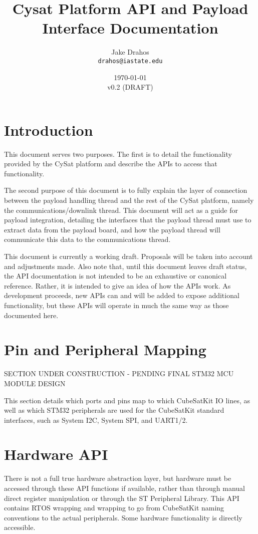 \documentclass{article}
\begin{document}
\title{Cysat Platform API and Payload Interface Documentation}
\author{Jake Drahos \\ \texttt{drahos@iastate.edu}}
\date{\today\\v0.2 (DRAFT)}

\maketitle

\tableofcontents

\section{Introduction}
This document serves two purposes. The first is to detail the functionality 
provided by the CySat platform and
describe the APIs to access that functionality.

The second purpose of this document is to fully explain the layer of connection
between the payload handling thread and the rest of the CySat platform, namely
the communications/downlink thread. This document will act as a guide for
payload integration, detailing the interfaces that the payload thread must
 use
to extract data from the payload board, and how the payload thread will 
communicate this data to the communications thread.

This document is currently a working draft. Proposals will be taken into account
and adjustments made. Also note that, until this document leaves draft status,
the API documentation is not intended to be an exhaustive or canonical
reference. Rather, it is intended to give an idea of how the APIs work. As
development proceeds, new APIs can and will be added to expose additional
functionality, but these APIs will operate in much the same way as those
documented here.

\section{Pin and Peripheral Mapping}

SECTION UNDER CONSTRUCTION - PENDING FINAL STM32 MCU MODULE DESIGN

This section details which ports and pins map to which CubeSatKit IO lines,
as well as which STM32 peripherals are used for the CubeSatKit standard 
interfaces, such as System I2C, System SPI, and UART1/2.

\section{Hardware API}
There is not a full true hardware abstraction layer, but hardware must be
accessed through these API functions if available, rather than through manual
direct register manipulation or through the ST Peripheral Library. This API
contains RTOS wrapping and wrapping to go from CubeSatKit naming conventions
to the actual peripherals. Some hardware functionality is directly accessible.
\\
\end{document}
